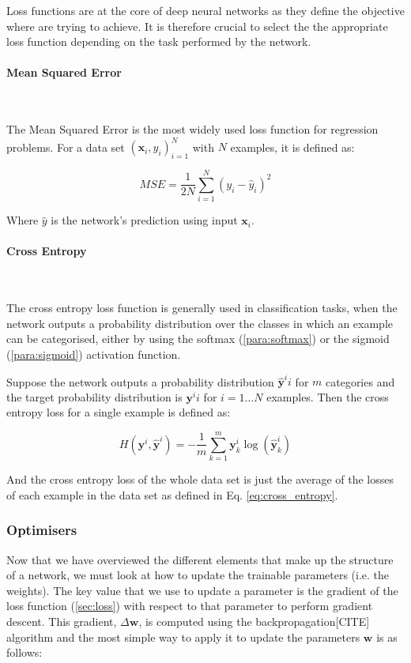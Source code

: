 \documentclass[12pt,twoside]{article}
\newcommand{\para}[1]{\paragraph{#1}\mbox{}\\}
\begin{document}
Loss functions are at the core of deep neural networks as they define the
objective where are trying to achieve. It is therefore crucial to select the
the appropriate loss function depending on the task performed by the network.

\para{Mean Squared Error}\label{para:mse}

The Mean Squared Error is the most widely used loss function for regression
problems. For a data set $\left( \bm{x}_i, y_i \right)_{i=1}^N$ with $N$
examples, it is defined as:

\begin{equation}
  MSE = \frac{1}{2N}\sum_{i=1}^N (y_i - \hat{y}_i)^2
  \label{eq:mse}
\end{equation}

Where $\hat{y}$ is the network's prediction using input $\bm{x}_i$.

\para{Cross Entropy}\label{para:cross_entropy}

The cross entropy loss function is generally used in classification tasks, when
the network outputs a probability distribution over the classes in which an
example can be categorised, either by using the softmax (\ref{para:softmax}) or the
sigmoid (\ref{para:sigmoid}) activation function.

Suppose the network outputs a probability distribution $\hat{\bm{y}}^ii$ for
$m$ categories and the target
probability distribution is $\bm{y}^ii$ for $i=1\dots N$ examples. 
Then the cross entropy loss for a single example is defined as:

\begin{equation}
  H(\bm{y}^i, \hat{\bm{y}}^i) = -\frac{1}{m} \sum_{k=1}^m \bm{y}_k^i
  \log(\hat{\bm{y}}_k^i)
  \label{eq:cross_entropy}
\end{equation}

And the cross entropy loss of the whole data set is just the average of the
losses of each example in the data set as defined in Eq.
\eqref{eq:cross_entropy}.

\subsubsection{Optimisers}\label{sec:optimisers}

Now that we have overviewed the different elements that make up the structure
of a network, we must look at how to update the trainable parameters (i.e. the
weights). The key value that we use to update a parameter is the gradient of the loss function
(\ref{sec:loss}) with respect to that parameter to perform gradient descent.
This gradient,  $\Delta\bm{w}$, is computed using the backpropagation[CITE] algorithm and
the most simple way to apply it to update the parameters $\bm{w}$ is as follows:
\end{document}
